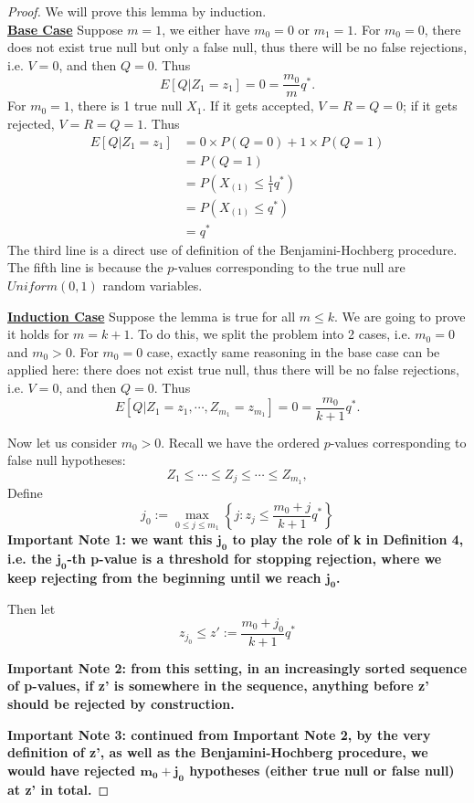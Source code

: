 \documentclass[12pt]{article}
\theoremstyle{plain}
\theoremstyle{definition}
\theoremstyle{remark}
\begin{document}
\begin{proof} \cite{5.3} We will prove this lemma by induction.\\
\underline{\textbf{Base Case}}\; Suppose $m=1$, we either have $m_0=0$ or $m_1=1$. For $m_0=0$, there does not exist true null but only a false null, thus there will be no false rejections, i.e. $V=0$, and then $Q=0$. Thus $$E[Q|Z_1=z_1]=0=\frac{m_0}{m}q^*.$$
For $m_0=1$, there is 1 true null $X_1$. If it gets accepted, $V=R=Q=0$; if it gets rejected, $V=R=Q=1$. Thus
\begin{align*}
    E[Q|Z_1=z_1]&=0\times P(Q=0)+1\times P(Q=1)\\
    &=P(Q=1)\\
    &=P(X_{(1)}\leq \frac{1}{1}q^*)\\
    &=P(X_{(1)}\leq q^*)\\
    &=q^*
\end{align*}
The third line is a direct use of definition of the Benjamini-Hochberg procedure. The fifth line is because the $p$-values corresponding to the true null are $Uniform(0,1)$ random variables.

\underline{\textbf{Induction Case}}\; Suppose the lemma is true for all $m\leq k$. We are going to prove it holds for $m=k+1$. To do this, we split the problem into 2 cases, i.e. $m_0=0$ and $m_0>0$. For $m_0=0$ case, exactly same reasoning in the base case can be applied here: there does not exist true null, thus there will be no false rejections, i.e. $V=0$, and then $Q=0$. Thus $$E[Q|Z_1=z_1,\cdots,Z_{m_1}=z_{m_1}]=0=\frac{m_0}{k+1}q^*.$$

Now let us consider $m_0>0$. Recall we have the ordered $p$-values corresponding to false null hypotheses: 
$$Z_1\leq \cdots\leq Z_j\leq \cdots\leq Z_{m_1},$$ 
Define \[
j_0:=\max_{0\leq j\leq m_1}\left\{j:z_j\leq
\frac{m_0+j}{k+1}q^*\right\}
\]
\textbf{Important Note 1: we want this $\mathbf{j_0}$ to play the role of k in Definition 4, i.e. the $\mathbf{j_0}$-th p-value is a threshold for stopping rejection, where we keep rejecting from the beginning until we reach $\mathbf{j_0}$.}

Then let\[
z_{j_0}\leq z':=\frac{m_0+j_0}{k+1}q^*
\]

\textbf{Important Note 2: from this setting, in an increasingly sorted sequence of p-values, if z' is somewhere in the sequence, anything before z' should be rejected by construction.}

\textbf{Important Note 3: continued from Important Note 2, by the very definition of z', as well as the Benjamini-Hochberg procedure, we would have rejected $\mathbf{m_0+j_0}$ hypotheses (either true null or false null) at z' in total.}


\end{proof}
\end{document}
